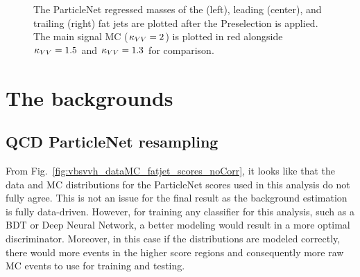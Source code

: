 \begin{figure}[htb]
    \centering
    \qquad
    \qquad
    \caption{
        The ParticleNet regressed masses \MPNet of the \Htobb (left), leading \Vtoqq (center), and trailing \Vtoqq (right) fat jets are plotted after the Preselection is applied. 
        The main signal MC ($\kappa_{VV} = 2$) is plotted in red alongside $\kappa_{VV} = 1.5$ and $\kappa_{VV} = 1.3$ for comparison. 
    }
    \label{fig:vbsvvh_fatjet_masses}
\end{figure}

\section{The backgrounds}
\subsection{QCD ParticleNet resampling}
From Fig.~\ref{fig:vbsvvh_dataMC_fatjet_scores_noCorr}, it looks like that the data and MC distributions for the ParticleNet scores used in this analysis do not fully agree. 
This is not an issue for the final result as the background estimation is fully data-driven. 
However, for training any classifier for this analysis, such as a BDT or Deep Neural Network, a better modeling would result in a more optimal discriminator.
Moreover, in this case if the distributions are modeled correctly, there would more events in the higher score regions
and consequently more raw MC events to use for training and testing. 

